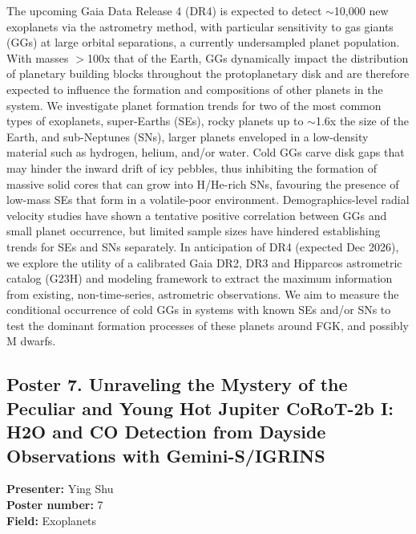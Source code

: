 The upcoming Gaia Data Release 4 (DR4) is expected to detect $\sim$10,000 new exoplanets via the astrometry method, with particular sensitivity to gas giants (GGs) at large orbital separations, a currently undersampled planet population. With masses $>$100x that of the Earth, GGs dynamically impact the distribution of planetary building blocks throughout the protoplanetary disk and are therefore expected to influence the formation and compositions of other planets in the system. We investigate planet formation trends for two of the most common types of exoplanets, super-Earths (SEs), rocky planets up to $\sim$1.6x the size of the Earth, and sub-Neptunes (SNs), larger planets enveloped in a low-density material such as hydrogen, helium, and/or water. Cold GGs carve disk gaps that may hinder the inward drift of icy pebbles, thus inhibiting the formation of massive solid cores that can grow into H/He-rich SNs, favouring the presence of low-mass SEs that form in a volatile-poor environment. Demographics-level radial velocity studies have shown a tentative positive correlation between GGs and small planet occurrence, but limited sample sizes have hindered establishing trends for SEs and SNs separately. In anticipation of DR4 (expected Dec 2026), we explore the utility of a calibrated Gaia DR2, DR3 and Hipparcos astrometric catalog (G23H) and modeling framework to extract the maximum information from existing, non-time-series, astrometric observations. We aim to measure the conditional occurrence of cold GGs in systems with known SEs and/or SNs to test the dominant formation processes of these planets around FGK, and possibly M dwarfs.

\hypertarget{poster-abstract-talk-91}{}\label{poster-abstract-page-talk-91}
\subsection*{Poster 7. Unraveling the Mystery of the Peculiar and Young Hot Jupiter CoRoT-2b I: H2O and CO Detection from Dayside Observations with Gemini-S/IGRINS}
\textbf{Presenter:} Ying Shu\\
\textbf{Poster number:} 7\\
\textbf{Field:} Exoplanets

